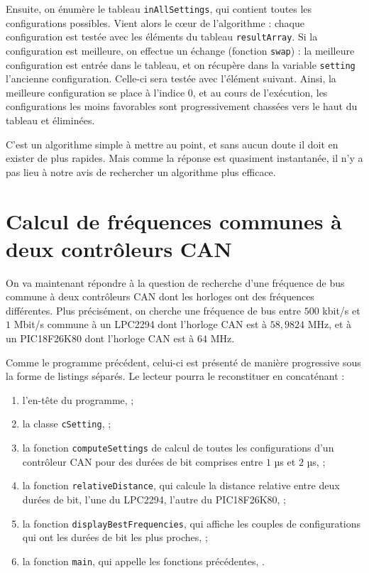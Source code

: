 Ensuite, on énumère le tableau \texttt{inAllSettings}, qui contient toutes les configurations possibles. Vient alors le cœur de l'algorithme : chaque configuration est testée avec les éléments du tableau \texttt{resultArray}. Si la configuration est meilleure, on effectue un échange (fonction \texttt{swap}) : la meilleure configuration est entrée dans le tableau, et on récupère dans la variable \texttt{setting} l'ancienne configuration. Celle-ci sera testée avec l'élément suivant. Ainsi, la meilleure configuration se place à l'indice $0$, et au cours de l'exécution, les configurations les moins favorables sont progressivement chassées vers le haut du tableau et éliminées.

C'est un algorithme simple à mettre au point, et sans aucun doute il doit en exister de plus rapides. Mais comme la réponse est quasiment instantanée, il n'y a pas lieu à notre avis de rechercher un algorithme plus efficace.







\section{Calcul de fréquences communes à deux contrôleurs CAN}

On va maintenant répondre à la question de recherche d'une fréquence de bus commune à deux contrôleurs CAN dont les horloges ont des fréquences différentes. Plus précisément, on cherche une fréquence de bus entre $500$ kbit/s et $1$ Mbit/s commune à un LPC2294 dont l'horloge CAN est à $58,9824$ MHz, et à un PIC18F26K80 dont l'horloge CAN est à $64$ MHz.

Comme le programme précédent, celui-ci est présenté de manière progressive sous la forme de listings séparés. Le lecteur pourra le reconstituer en concaténant :
\begin{enumerate}
  \item l'en-tête du programme,  ;
  \item la classe \texttt{cSetting},  ;
  \item la fonction \texttt{computeSettings} de calcul de toutes les configurations d'un contrôleur CAN pour des durées de bit comprises entre $1$ µs et $2$ µs,  ;
  \item la fonction \texttt{relativeDistance}, qui calcule la distance relative entre deux durées de bit, l'une du LPC2294, l'autre du PIC18F26K80,  ;
  \item la fonction \texttt{displayBestFrequencies}, qui affiche les couples de configurations qui ont les durées de bit les plus proches,  ;
  \item la fonction \texttt{main}, qui appelle les fonctions précédentes, .
\end{enumerate}

